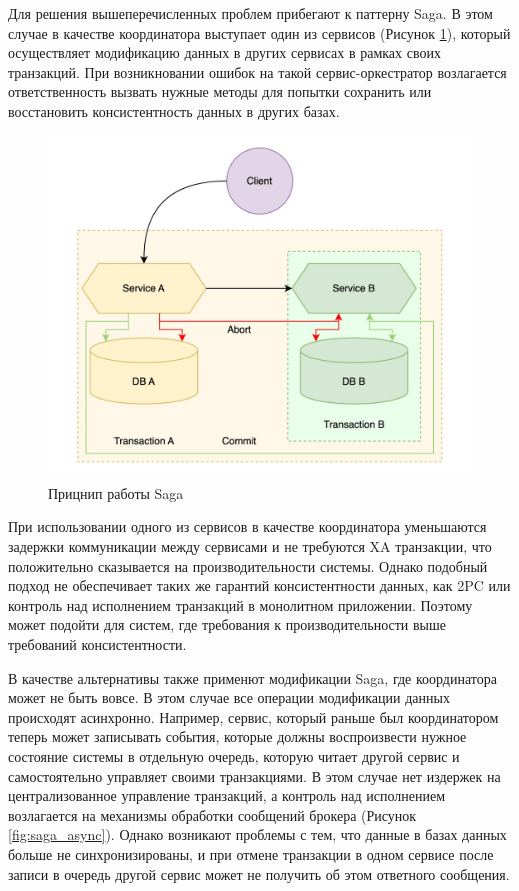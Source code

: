 Для решения вышеперечисленных проблем прибегают к паттерну Saga. В этом случае в качестве координатора
выступает один из сервисов (Рисунок \ref{fig:saga}), который осуществляет модификацию данных в других сервисах в рамках своих транзакций.
При возникновании ошибок на такой сервис-оркестратор возлагается ответственность вызвать нужные методы
для попытки сохранить или восстановить консистентность данных в других базах.

\begin{figure}[H]
    \centering
    \includegraphics[width=0.8\linewidth]{img/saga.png}
    \caption{Прицнип работы Saga}
    \label{fig:saga}
\end{figure}

При использовании одного из сервисов в качестве координатора уменьшаются задержки
коммуникации между сервисами и не требуются XA транзакции, что положительно сказывается на производительности
системы. Однако подобный подход не обеспечивает таких же гарантий консистентности данных, как 2PC или контроль над исполнением
транзакций в монолитном приложении. Поэтому может подойти для систем, где требования к производительности выше требований консистентности.

В качестве альтернативы также применют модификации Saga, где координатора может не быть вовсе. В этом
случае все операции модификации данных происходят асинхронно. Например, сервис, который раньше был координатором теперь может записывать
события, которые должны воспроизвести нужное состояние системы в отдельную очередь, которую читает другой сервис и самостоятельно управляет своими транзакциями.
В этом случае нет издержек на централизованное управление транзакций, а контроль над исполнением возлагается на механизмы обработки сообщений брокера (Рисунок \ref{fig:saga_async}).
Однако возникают проблемы с тем, что данные в базах данных больше не синхронизированы, 
и при отмене транзакции в одном сервисе после записи в очередь другой сервис может не получить об этом ответного сообщения.

